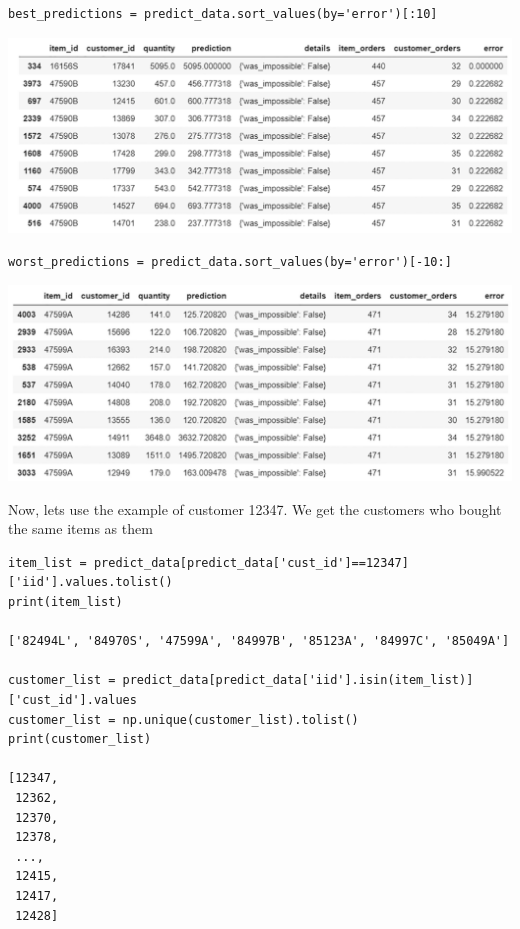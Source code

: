 \documentclass{article}
\begin{document}
\begin{lstlisting}
best_predictions = predict_data.sort_values(by='error')[:10]
\end{lstlisting}

\begin{center}
\includegraphics[scale=0.45]{07.png}
\end{center}

\begin{lstlisting}
worst_predictions = predict_data.sort_values(by='error')[-10:]
\end{lstlisting}

\begin{center}
\includegraphics[scale=0.45]{08.png}
\end{center}

Now, lets use the example of customer 12347. We get the customers who bought the same items as them

\begin{lstlisting}
item_list = predict_data[predict_data['cust_id']==12347]['iid'].values.tolist()
print(item_list)

['82494L', '84970S', '47599A', '84997B', '85123A', '84997C', '85049A']

customer_list = predict_data[predict_data['iid'].isin(item_list)]['cust_id'].values
customer_list = np.unique(customer_list).tolist()
print(customer_list)

[12347,
 12362,
 12370,
 12378,
 ...,
 12415,
 12417,
 12428]
\end{lstlisting}
\end{document}
